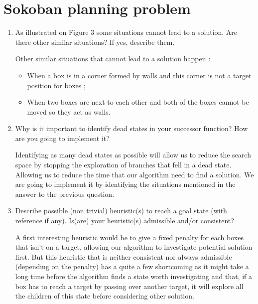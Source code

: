 \section{Sokoban planning problem}

\begin{enumerate}
 \item As illustrated on Figure 3 some situations cannot lead to a solution. Are there
other similar situations? If yes, describe them.
  \begin{framed}
        Other similar situations that cannot lead to a solution happen :
        \begin{itemize}
            \item When a box is in a corner formed by walls and
                this corner is not a target position for boxes ;
            \item When two boxes are next to each other and both of the boxes cannot be moved so they act as
                walls.
        \end{itemize}
  \end{framed}
  \item Why is it important to identify dead states in your successor function? How
are you going to implement it?
    \begin{framed}
        Identifying as many dead states as possible will allow us to reduce
        the search space by stopping the exploration of branches that fell
        in a dead state. Allowing us to reduce the time that our algorithm
        need to find a solution. We are going to implement it by
        identifying the situations mentioned in the answer to the previous
        question.
    \end{framed}
  \item Describe possible (non trivial) heuristic(s) to reach a goal state (with reference
if any). Is(are) your heuristic(s) admissible and/or consistent?
    \begin{framed}
    A first interesting heuristic would be to give a fixed penalty for each
    boxes that isn't on a target, allowing our algorithm to investigate
    potential solution first. But this heuristic that is neither consistent
    nor always admissible (depending on the penalty) has a quite a few
    shortcoming as it might take a long time before the algorithm finds a
    state worth investigating and that, if a box has to reach a target by
    passing over another target, it will explore all the children of this
    state before considering other solution. \newline


\end{framed}
\end{enumerate}
